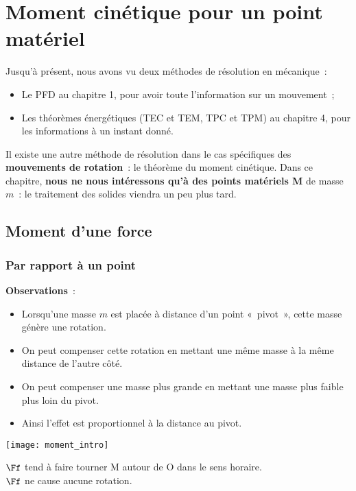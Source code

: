 \documentclass[../main/main.tex]{subfiles}
\begin{document}
\setcounter{chapter}{5}

\chapter{Moment cin\'etique pour un point mat\'eriel}
Jusqu'à présent, nous avons vu deux méthodes de résolution en mécanique~:
\begin{itemize}
    \item Le PFD au chapitre 1, pour avoir toute l'information sur un
        mouvement~;
    \item Les théorèmes énergétiques (TEC et TEM, TPC et TPM) au chapitre 4,
        pour les informations à un instant donné.
\end{itemize}
Il existe une autre méthode de résolution dans le cas spécifiques des
\textbf{mouvements de rotation}~: le théorème du moment cinétique. Dans ce
chapitre, \textbf{nous ne nous intéressons qu'à des points matériels M} de masse
$m$~: le traitement des solides viendra un peu plus tard.

\section{Moment d'une force}
\subsection{Par rapport à un point}
\textbf{Observations}~:
\begin{itemize}
    \item Lorsqu'une masse $m$ est placée à distance d'un point «~pivot~», cette
        masse génère une rotation.
    \item On peut compenser cette rotation en mettant une même masse à la même
        distance de l'autre côté.
    \item On peut compenser une masse plus grande en mettant une masse plus
        faible plus loin du pivot.
    \item Ainsi l'effet est proportionnel à la distance au pivot.
\end{itemize}

\begin{minipage}{0.45\linewidth}
    \begin{center}
        \texttt{[image: moment\_intro]}
    \end{center}
\end{minipage}
\hfill
\begin{minipage}{0.45\linewidth}
    $\Ff$ tend à faire tourner M autour de O dans le sens horaire.\\[2.5em]
    $\Ff$ ne cause aucune rotation.
\end{minipage} \bigbreak
\end{document}
